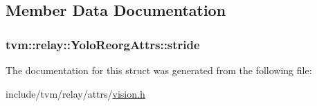 \subsection{Member Data Documentation}
\subsubsection[{\texorpdfstring{stride}{stride}}]{ tvm\+::relay\+::\+Yolo\+Reorg\+Attrs\+::stride}\hypertarget{structtvm_1_1relay_1_1YoloReorgAttrs_a720c79759a2f2b603b006b0bfcab5fe0}{}\label{structtvm_1_1relay_1_1YoloReorgAttrs_a720c79759a2f2b603b006b0bfcab5fe0}


The documentation for this struct was generated from the following file\+:\begin{DoxyCompactItemize}
\item 
include/tvm/relay/attrs/\hyperlink{vision_8h}{vision.\+h}\end{DoxyCompactItemize}
